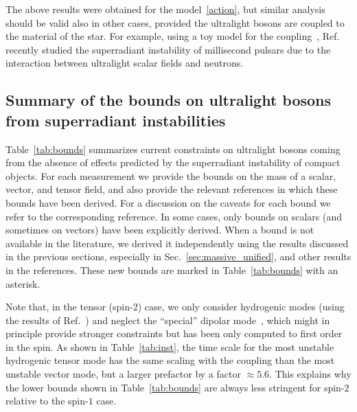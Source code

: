 \documentclass[11pt]{article}
\numberwithin{equation}{section} %
\begin{document}
The above results were obtained for the model~\eqref{action}, but similar analysis should be valid also in other cases, provided the ultralight bosons are coupled to the material of the star. For example, using a toy model for the coupling~\cite{Cardoso:2015zqa}, Ref.~\cite{Kaplan:2019ako} recently studied the superradiant instability of millisecond pulsars due to the interaction between ultralight scalar fields and neutrons.


\subsection{Summary of the bounds on ultralight bosons from superradiant instabilities} \label{sec:bounds}

Table~\ref{tab:bounds} summarizes current constraints on ultralight bosons coming from the absence of effects predicted 
by the superradiant instability of compact objects. 
%
For each measurement we provide the bounds on the mass of a scalar, vector, and tensor field, and also provide the 
relevant references in which these bounds have been derived. For a discussion on the caveats for each bound we refer to
the corresponding reference. 
%
In some cases, only bounds on scalars (and sometimes on vectors) have been explicitly derived. When a bound is not 
available in the literature, we derived it independently using the results discussed in the previous sections, 
especially in Sec.~\ref{sec:massive_unified}, and other results in the references. These new bounds are marked in 
Table~\ref{tab:bounds} with an asterisk. 

Note that, in the tensor (spin-2) case, we only consider hydrogenic modes (using the results of 
Ref.~\cite{Brito:2020lup}) and neglect the ``special'' dipolar mode~\cite{Brito:2013wya}, which might in principle 
provide stronger constraints but has been only computed to first order in the spin. As shown in Table~\ref{tab:inst}, 
the time scale for the most unstable hydrogenic tensor mode has the same scaling with the coupling than the most 
unstable vector mode, but a larger prefactor by a factor $\approx 5.6$. This explains why the lower bounds shown in 
Table~\ref{tab:bounds} are always less stringent for spin-$2$ relative to the spin-$1$ case.
\end{document}

